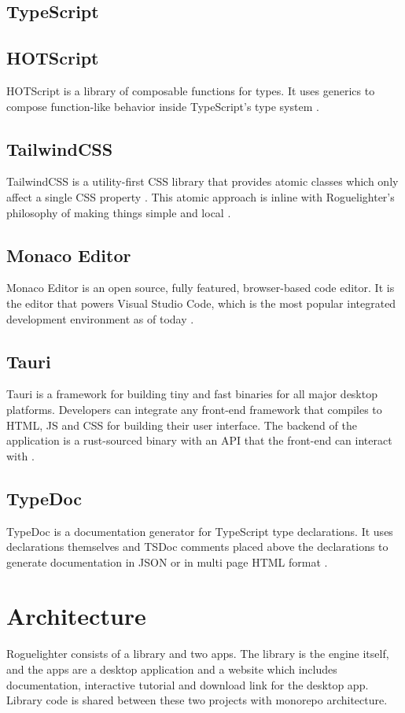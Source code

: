 \documentclass{article}
\begin{document}
\subsection{TypeScript}

\subsection{HOTScript}
HOTScript is a library of composable functions for types. It uses generics to compose function-like behavior inside TypeScript’s type system \cite{hotscript}.

\subsection{TailwindCSS}
TailwindCSS is a utility-first CSS library that provides atomic classes which only affect a single CSS property . This atomic approach is inline with Roguelighter's philosophy of making things simple and local \cite{tailwindcss}.

\subsection{Monaco Editor}
Monaco Editor is an open source, fully featured, browser-based code editor. It is the editor that powers Visual Studio Code, which is the most popular integrated development environment as of today \cite{monaco-editor}\cite{developer-survey}.

\subsection{Tauri}
Tauri is a framework for building tiny and fast binaries for all major desktop platforms. Developers can integrate any front-end framework that compiles to HTML, JS and CSS for building their user interface. The backend of the application is a rust-sourced binary with an API that the front-end can interact with \cite{tauri}.

\subsection{TypeDoc}
TypeDoc is a documentation generator for TypeScript type declarations. It uses declarations themselves and TSDoc comments placed above the declarations to generate documentation in JSON or in multi page HTML format \cite{typedoc}.

\section{Architecture}
Roguelighter consists of a library and two apps. The library is the engine itself, and the apps are a desktop application and a website which includes documentation, interactive tutorial and download link for the desktop app. Library code is shared between these two projects with monorepo architecture.
\end{document}
